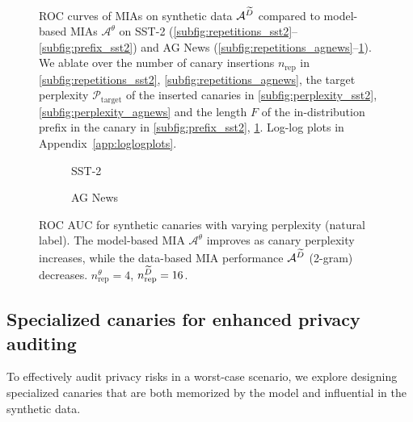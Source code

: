 \begin{figure*}[ht]
\begin{subfigure}{0.32\textwidth}
    \label{subfig:prefix_agnews}
  \end{subfigure}
  \caption{
    ROC curves of MIAs on synthetic data $\mathcal{A}^{{\widetilde{D}}}$ compared to model-based MIAs $\mathcal{A}^{\theta}$ on SST-2 (\ref{subfig:repetitions_sst2}--\ref{subfig:prefix_sst2}) and AG News (\ref{subfig:repetitions_agnews}--\ref{subfig:prefix_agnews}).
    We ablate over the number of canary insertions $n_\textrm{rep}$ in \ref{subfig:repetitions_sst2}, \ref{subfig:repetitions_agnews}, the target perplexity $\mathcal{P}_\textrm{target}$ of the inserted canaries in \ref{subfig:perplexity_sst2}, \ref{subfig:perplexity_agnews} and the length $F$ of the in-distribution prefix in the canary in \ref{subfig:prefix_sst2}, \ref{subfig:prefix_agnews}. Log-log plots in Appendix~\ref{app:loglogplots}.
  } 
  \label{fig:roc_curves_main}
\end{figure*}

\begin{figure}[h!]
  \centering
  \begin{subfigure}{0.45\textwidth}
    \centering
    \resizebox{\textwidth}{!}{}
    \caption{SST-2}
  \end{subfigure}
  \begin{subfigure}{0.45\textwidth}
    \centering
    \resizebox{\textwidth}{!}{}
    \caption{AG News}
  \end{subfigure}
  \caption{
    ROC AUC for synthetic canaries with varying perplexity (natural label). The model-based MIA $\mathcal{A}^\theta$ improves as canary perplexity increases, while the data-based MIA performance $\mathcal{A}^{\widetilde{D}}$ (2-gram) decreases. $n_\textrm{rep}^\theta=4$, $n_\textrm{rep}^{{\widetilde{D}}}=16$.
  } 
  \label{fig:ppl_exp}
\end{figure}


\subsection{Specialized canaries for enhanced privacy auditing}
\label{sec:designing_canaries}

To effectively audit privacy risks in a worst-case scenario, we explore designing specialized canaries that are both memorized by the model and influential in the synthetic data.

